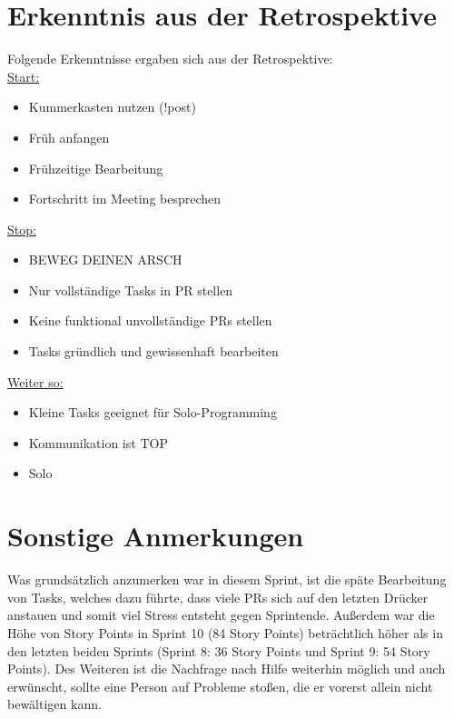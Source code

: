 \documentclass[12pt,a4paper, oneside]{article}
\begin{document}
    \section{Erkenntnis aus der Retrospektive}
    Folgende Erkenntnisse ergaben sich aus der Retrospektive:\\

    \underline{Start:}
    \begin{itemize}
        \item Kummerkasten nutzen (!post)
        \item Früh anfangen
        \item Frühzeitige Bearbeitung
        \item Fortschritt im Meeting besprechen
    \end{itemize}

    \underline{Stop:}
    \begin{itemize}
        \item BEWEG DEINEN ARSCH
        \item Nur vollständige Tasks in PR stellen
        \item Keine funktional unvollständige PRs stellen
        \item Tasks gründlich und gewissenhaft bearbeiten
    \end{itemize}

    \underline{Weiter so:}
    \begin{itemize}
        \item Kleine Tasks geeignet für Solo-Programming
        \item Kommunikation ist TOP
        \item Solo
    \end{itemize}

    \newpage


    \section{Sonstige Anmerkungen}
    Was grundsätzlich anzumerken war in diesem Sprint, ist die späte Bearbeitung von Tasks, welches dazu führte, dass viele PRs sich auf den letzten Drücker anstauen und somit viel Stress entsteht gegen Sprintende.
    Außerdem war die Höhe von Story Points in Sprint 10 (84 Story Points) beträchtlich höher als in den letzten beiden Sprints (Sprint 8: 36 Story Points und Sprint 9: 54 Story Points).
    Des Weiteren ist die Nachfrage nach Hilfe weiterhin möglich und auch erwünscht, sollte eine Person auf Probleme stoßen, die er vorerst allein nicht bewältigen kann.
\end{document}
